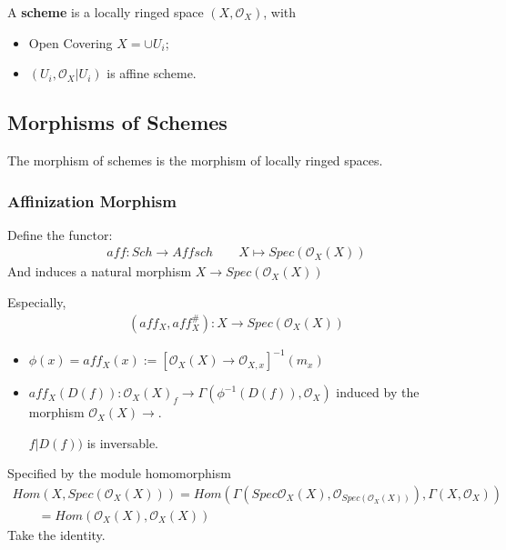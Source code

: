 \documentclass[Total.tex]{subfiles}
\begin{document}
		\begin{Def}
			A \textbf{scheme} is a locally ringed space $(X,\mathcal{O}_X)$, with
			
			\begin{itemize}
				\item Open Covering $X=\cup U_i$;
				\item $(U_i,\mathcal{O}_X|U_i)$ is affine scheme.
			\end{itemize}
		\end{Def}
		
		\subsection{Morphisms of Schemes}
		
		\begin{Def}
			The morphism of schemes is the morphism of locally ringed spaces.
		\end{Def}
		\subsubsection{Affinization Morphism}
		\begin{Def}
			\label{Algebraic-Geometry-Affinization-Map}Define the functor:
			\begin{gather*}
				aff:Sch\rightarrow Affsch\qquad X\mapsto Spec(\mathcal{O}_X(X))
			\end{gather*}
			And induces a natural morphism $X\rightarrow Spec(\mathcal{O}_X(X))$
		\end{Def}
		Especially,
		\begin{gather*}
			(aff_X,aff_X^\#):X\rightarrow Spec(\mathcal{O}_X(X))
		\end{gather*}
		\begin{itemize}
			\item $\phi(x)=aff_X(x):=[\mathcal{O}_X(X)\rightarrow \mathcal{O}_{X,x}]^{-1}(m_x)$
			\item $aff_X(D(f)):\mathcal{O}_X(X)_f\rightarrow \Gamma(\phi^{-1}(D(f)),\mathcal{O}_X)$ induced by the morphism $\mathcal{O}_X(X)\rightarrow$. 
			
			$f|D(f))$ is inversable. 
		\end{itemize}
		Specified by the module homomorphism
		\begin{gather*}
			Hom(X,Spec(\mathcal{O}_X(X)))=Hom(\Gamma(Spec\mathcal{O}_X(X),\mathcal{O}_{Spec(\mathcal{O}_X(X))}),\Gamma(X,\mathcal{O}_X))\\
			\qquad=Hom(\mathcal{O}_X(X),\mathcal{O}_X(X))
		\end{gather*}
		Take the identity.
		
\end{document}
